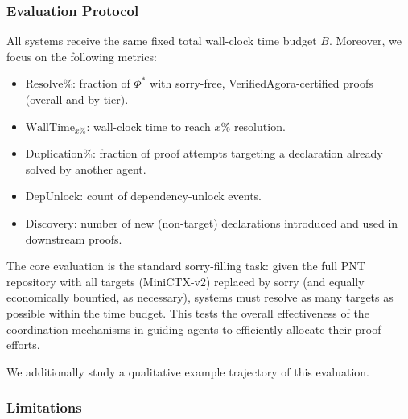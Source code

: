 \subsubsection{Evaluation Protocol}\label{sec:protocol}

All systems receive the same fixed total wall-clock time budget $B$. Moreover, we focus on the following metrics:
\begin{itemize}
    \item $\mathrm{Resolve\%}$: fraction of $\Phi^*$ with sorry-free, VerifiedAgora-certified proofs (overall and by tier).
    \item $\mathrm{WallTime}_{x\%}$: wall-clock time to reach $x\%$ resolution.
    \item $\mathrm{Duplication\%}$: fraction of proof attempts targeting a declaration already solved by another agent.
    \item $\mathrm{DepUnlock}$: count of dependency-unlock events.
    \item $\mathrm{Discovery}$: number of new (non-target) declarations introduced and used in downstream proofs.
\end{itemize}

The core evaluation is the standard sorry-filling task: given the full PNT repository with all targets (MiniCTX-v2) replaced by sorry (and equally economically bountied, as necessary), systems must resolve as many targets as possible within the time budget. This tests the overall effectiveness of the coordination mechanisms in guiding agents to efficiently allocate their proof efforts.


We additionally study a qualitative example trajectory of this evaluation.


\subsubsection{Limitations}\label{sec:limitations}


